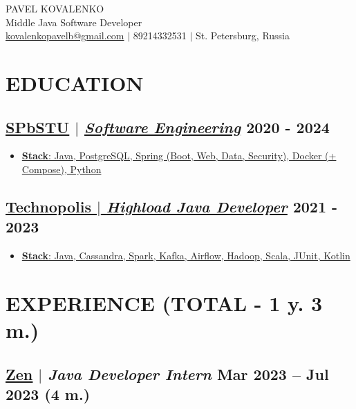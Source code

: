 \documentclass[11pt]{article}
\begin{document}
\begin{center}
    {\fontsize{36}{36}\selectfont PAVEL KOVALENKO} \\ \bigskip
    {\fontsize{25}{25}\selectfont Middle Java Software Developer} \\ \bigskip
    {\color{icnclr}\faEnvelope[email]} \href{mailto:kovalenkopavelb@gmail.com}{kovalenkopavelb@gmail.com} $|$ 
    {\color{icnclr}} 89214332531 $|$
    {\color{icnclr}\faMapMarker} St. Petersburg, Russia
\end{center}

\section{EDUCATION}
\subsection{\href{https://www.spbstu.ru/}{\underline{SPbSTU}} $|$ {\normalfont\textit{\href{https://www.spbstu.ru/structure/graduate_school_software_engineering/}{\underline{Software Engineering}}}} \hfill 2020 - 2024}
\begin{itemize}
    \item \underline{\textbf{Stack}: Java, PostgreSQL, Spring (Boot, Web, Data, Security), Docker (+ Compose), Python}
\end{itemize}

\subsection{\href{https://polis.vk.company/}{\underline{Technopolis} $|$ {\normalfont\textit{\underline{Highload Java Developer}}}} \hfill 2021 - 2023}
\begin{itemize}
    \item \underline{\textbf{Stack}: Java, Cassandra, Spark, Kafka, Airflow, Hadoop, Scala, JUnit, Kotlin}
\end{itemize}

\section{EXPERIENCE (TOTAL - 1 y. 3 m.)}
\subsection{\href{https://dzen.ru}{\underline{Zen}} $|$ {\normalfont\textit{Java Developer Intern}} \hfill Mar 2023 -- Jul 2023 (4 m.)}
\end{document}
